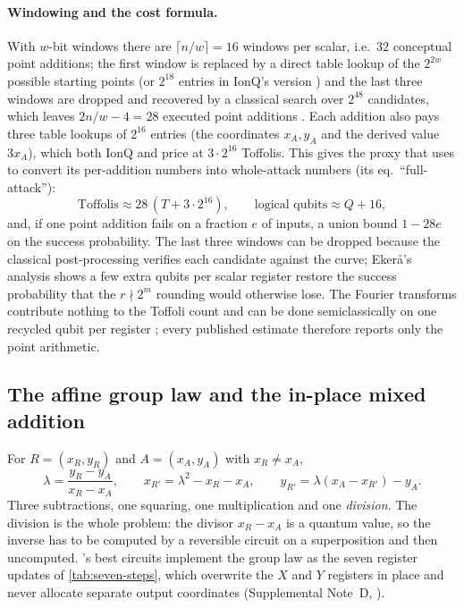 \paragraph{Windowing and the cost formula.}
With $w$-bit windows there are $\lceil n/w\rceil=16$ windows per scalar, i.e.\ $32$ conceptual point additions; the first window is replaced by a direct table lookup of the $2^{2w}$ possible starting points (or $2^{18}$ entries in IonQ's version \cite{haener26}) and the last three windows are dropped and recovered by a classical search over $2^{48}$ candidates, which leaves $2n/w-4=28$ executed point additions \cite{babbush26,haener26,ecdsafail26}. Each addition also pays three table lookups of $2^{16}$ entries (the coordinates $x_A,y_A$ and the derived value $3x_A$), which both IonQ and \ecdsafail{} price at $3\cdot2^{16}$ Toffolis. This gives the proxy that \ecdsafail{} uses to convert its per-addition numbers into whole-attack numbers (its eq.~``full-attack''):
\begin{equation}\label{eq:full-attack}
\text{Toffolis}\approx 28\,(T+3\cdot2^{16}),\qquad \text{logical qubits}\approx Q+16,
\end{equation}
and, if one point addition fails on a fraction $e$ of inputs, a union bound $1-28e$ on the success probability. The last three windows can be dropped because the classical post-processing verifies each candidate against the curve; Eker{\aa}'s analysis \cite{ekera19} shows a few extra qubits per scalar register restore the success probability that the $r\nmid2^m$ rounding would otherwise lose. The Fourier transforms contribute nothing to the Toffoli count and can be done semiclassically on one recycled qubit per register \cite{griffiths-niu96}; every published estimate therefore reports only the point arithmetic.

\subsection{The affine group law and the in-place mixed addition}

For $R=(x_R,y_R)$ and $A=(x_A,y_A)$ with $x_R\neq x_A$,
\begin{equation}\label{eq:grouplaw}
\lambda=\frac{y_R-y_A}{x_R-x_A},\qquad x_{R'}=\lambda^2-x_R-x_A,\qquad y_{R'}=\lambda(x_A-x_{R'})-y_A .
\end{equation}
Three subtractions, one squaring, one multiplication and one \emph{division}. The division is the whole problem: the divisor $x_R-x_A$ is a quantum value, so the inverse has to be computed by a reversible circuit on a superposition and then uncomputed. \ecdsafail{}'s best circuits implement the group law as the seven register updates of \cref{tab:seven-steps}, which overwrite the $X$ and $Y$ registers in place and never allocate separate output coordinates (Supplemental Note~D, \cite{ecdsafail26}).

